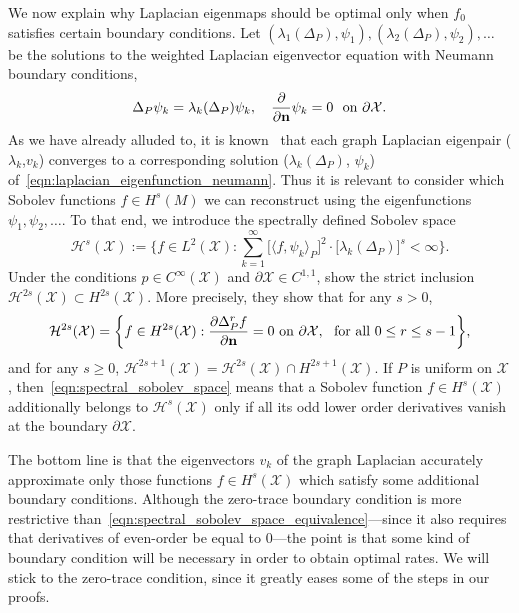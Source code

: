 \documentclass{article}
\newcommand{\1}{\mathbf{1}}
\newcommand{\mc}[1]{\mathcal{#1}}
\newcommand{\dotp}[2]{\langle #1, #2 \rangle}
\theoremstyle{alden}
\theoremstyle{aldenthm}
\theoremstyle{definition}
\theoremstyle{remark}
\begin{document}
We now explain why Laplacian eigenmaps should be optimal only when $f_0$ satisfies certain boundary conditions. Let $(\lambda_1(\Delta_P),\psi_1),(\lambda_2(\Delta_P),\psi_2),\ldots$ be the solutions to the weighted Laplacian eigenvector equation with Neumann boundary conditions, 
\begin{equation}
\label{eqn:laplacian_eigenfunction_neumann}
\Delta_P\psi_k = \lambda_{k}(\Delta_P) \psi_k, \quad \frac{\partial}{\partial {\bf n}}\psi_k = 0~~\textrm{on $\partial \mc{X}$}.
\end{equation}
As we have already alluded to, it is known~\citep{garciatrillos18} that each graph Laplacian eigenpair ($\lambda_k$,$v_k$) converges to a corresponding solution ($\lambda_k(\Delta_P)$, $\psi_k$) of~\eqref{eqn:laplacian_eigenfunction_neumann}. Thus it is relevant to consider which Sobolev functions $f \in H^s(M)$ we can reconstruct using the eigenfunctions $\psi_1,\psi_2,\ldots$. To that end, we introduce the spectrally defined Sobolev space
\begin{equation}
\label{eqn:spectral_sobolev_space}
\mc{H}^s(\mc{X}) := \biggl\{f \in L^2(\mc{X}): \sum_{k = 1}^{\infty} \bigl[\dotp{f}{\psi_k}_P\bigr]^2 \cdot\bigl[\lambda_k(\Delta_P)\bigr]^s < \infty \biggr\}.
\end{equation}
Under the conditions $p \in C^{\infty}(\mc{X})$ and $\partial\mc{X} \in C^{1,1}$, \cite{dunlop2020} show the strict inclusion $\mc{H}^{2s}(\mc{X}) \subset H^{2s}(\mc{X})$. More precisely, they show that for any $s > 0$,
\begin{equation}
\label{eqn:spectral_sobolev_space_equivalence}
\mc{H}^{2s}(\mc{X}) = \biggl\{f \in H^{2s}(\mc{X}): \frac{\partial \Delta_P^rf}{\partial {\bf n}} = 0~\textrm{on}~\partial\mc{X},~~\textrm{for all $0 \leq r \leq s - 1$} \biggr\},
\end{equation}
and for any $s \geq 0$, $\mc{H}^{2s + 1}(\mc{X}) = \mc{H}^{2s}(\mc{X}) \cap H^{2s + 1}(\mc{X})$. If $P$ is uniform on $\mc{X}$, then~\eqref{eqn:spectral_sobolev_space} means that a Sobolev function $f \in H^{s}(\mc{X})$ additionally belongs to $\mc{H}^{s}(\mc{X})$ only if all its odd lower order derivatives vanish at the boundary $\partial\mc{X}$.

The bottom line is that the eigenvectors $v_k$ of the graph Laplacian accurately approximate only those functions $f \in H^{s}(\mc{X})$ which satisfy some additional boundary conditions. Although the zero-trace boundary condition is more restrictive than~\eqref{eqn:spectral_sobolev_space_equivalence}---since it also requires that derivatives of even-order be equal to $0$---the point is that some kind of boundary condition will be necessary in order to obtain optimal rates. We will stick to the zero-trace condition, since it greatly eases some of the steps in our proofs.
\end{document}
